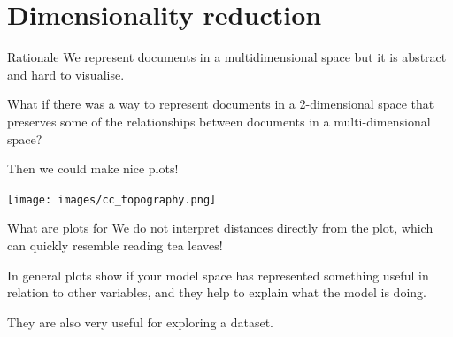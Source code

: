 \documentclass[
  10pt,
  ignorenonframetext,
  aspectratio=169]{beamer}
\begin{document}
\hypertarget{dimensionality-reduction}{%
\section{Dimensionality reduction}\label{dimensionality-reduction}}

\begin{frame}{Rationale}
\protect\hypertarget{rationale}{}
We represent documents in a multidimensional space but it is abstract
and hard to visualise.

What if there was a way to represent documents in a 2-dimensional space
that preserves some of the relationships between documents in a
multi-dimensional space?

Then we could make nice plots!
\end{frame}

\begin{frame}{}
\protect\hypertarget{section}{}
\centering

\texttt{[image: images/cc\_topography.png]}
\end{frame}

\begin{frame}{What are plots for}
\protect\hypertarget{what-are-plots-for}{}
We do not interpret distances directly from the plot, which can quickly
resemble reading tea leaves!

In general plots show if your model space has represented something
useful in relation to other variables, and they help to explain what the
model is doing.

They are also very useful for exploring a dataset.
\end{frame}
\end{document}

